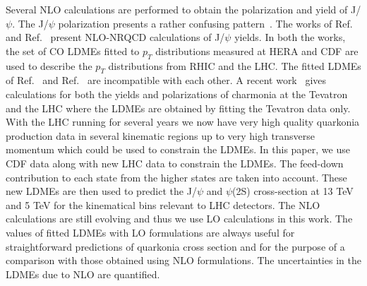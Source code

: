 \documentclass[aps,prc,preprint,superscriptaddress,showpacs,showkeys,amsmath]{revtex4-1}
\begin{document}
  Several NLO calculations are performed to obtain the polarization and yield of
J/$\psi$. The J/$\psi$ polarization presents a rather confusing 
pattern~\cite{Butenschoen:2012px,Chao:2012iv,Gong:2012ug}.
  The works of Ref.~\cite{Butenschoen:2010rq} and  Ref.~\cite{Ma:2010jj} present
NLO-NRQCD calculations of J/$\psi$ yields.
  In both the works, the set of CO LDMEs fitted to $p_{T}$ distributions measured 
at HERA and CDF are used to describe the $p_{T}$ distributions from RHIC and 
the LHC.
 The fitted LDMEs of Ref.~\cite{Butenschoen:2010rq} and  Ref.~\cite{Ma:2010jj}
are incompatible with each other. A recent work~\cite{Shao:2014yta} gives 
calculations for both the yields and polarizations of charmonia at the Tevatron 
and the LHC where the LDMEs are obtained by fitting the Tevatron data only.
  With the LHC running for several years we now have very high quality quarkonia 
production data in several kinematic regions up to very high transverse momentum 
which could be used to constrain the LDMEs. In this paper, we use CDF data
\cite{Abe:1997yz,Abe:1997jz,Acosta:2004yw,Abulencia:2007bra} along with new LHC data 
\cite{Chatrchyan:2011kc,Khachatryan:2015rra,Chatrchyan:2012ub,Aad:2015duc,ATLAS:2014ala,
Aaij:2012ag,Aaij:2011jh,Aaij:2015rla,Aaij:2013dja} to constrain 
the LDMEs. 
 The feed-down contribution to each state from the higher states are taken into account.
These new LDMEs are then used to predict the J/$\psi$ and $\psi$(2S)
cross-section at 13 TeV and 5 TeV for the kinematical bins relevant to LHC detectors.
 The NLO calculations are still evolving and thus we use LO calculations in 
this work. The values of fitted LDMEs with LO formulations are always useful 
for straightforward predictions of quarkonia cross section and for the 
purpose of a comparison with those obtained using NLO formulations.
 The uncertainties in the LDMEs due to NLO are quantified. 
\end{document}
